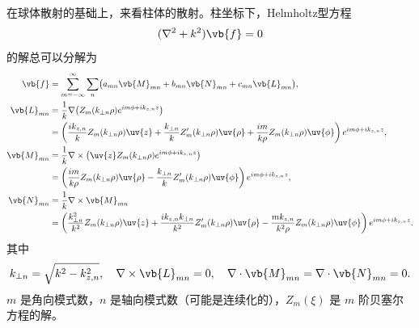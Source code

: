 在球体散射的基础上，来看柱体的散射。柱坐标下，Helmholtz型方程
\begin{align*}
	(\nabla^2 + k^2)\vb{f} = 0
\end{align*}
的解总可以分解为
\begin{align*}
	\vb{f}      & = \sum_{m=-\infty}^{\infty} \sum_n \bigl(a_{mn}\vb{M}_{mn} + b_{mn}\vb{N}_{mn} + c_{mn}\vb{L}_{mn}\bigr),                                                                                                                     \\
	\vb{L}_{mn} & = \frac{1}{k} \nabla \bigl(Z_m(k_{\perp n} \rho) e^{im\phi + ik_{z,n}z}\bigr)                                                                                                                                                 \\
	            & = \left( \frac{ik_{z,n}}{k} Z_m(k_{\perp n} \rho) \uv{z} + \frac{k_{\perp n}}{k} Z_m'(k_{\perp n} \rho) \uv{\rho} + \frac{im}{k\rho} Z_m(k_{\perp n} \rho) \uv{\phi} \right) e^{im\phi + ik_{z,n}z},                          \\
	\vb{M}_{mn} & = \frac{1}{k} \nabla \times \bigl(\uv{z} Z_m(k_{\perp n} \rho) e^{im\phi + ik_{z,n}z}\bigr)                                                                                                                                   \\
	            & = \left( \frac{im}{k\rho} Z_m(k_{\perp n} \rho) \uv{\rho} - \frac{k_{\perp n}}{k} Z_m'(k_{\perp n} \rho) \uv{\phi} \right) e^{im\phi + ik_{z,n}z},                                                                            \\
	\vb{N}_{mn} & = \frac{1}{k} \nabla \times \vb{M}_{mn}                                                                                                                                                                                       \\
	            & = \left( \frac{k_{\perp n}^2}{k^2} Z_m(k_{\perp n} \rho) \uv{z} + \frac{ik_{z,n}k_{\perp n}}{k^2} Z_m'(k_{\perp n} \rho) \uv{\rho} - \frac{mk_{z,n}}{k^2\rho} Z_m(k_{\perp n} \rho) \uv{\phi} \right) e^{im\phi + ik_{z,n}z}.
\end{align*}
其中
\begin{align*}
	k_{\perp n} = \sqrt{k^2 - k_{z,n}^2}, \quad
	\nabla \times \vb{L}_{mn} = 0, \quad
	\nabla \cdot \vb{M}_{mn} = \nabla \cdot \vb{N}_{mn} = 0.
\end{align*}
\(m\) 是角向模式数，\(n\) 是轴向模式数（可能是连续化的），\(Z_m(\xi)\) 是 \(m\) 阶贝塞尔方程的解。

